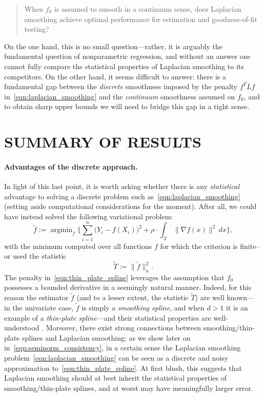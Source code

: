 \documentclass[twoside]{article}
\newcommand{\1}{\mathbf{1}}
\DeclareMathOperator*{\argmin}{argmin}
\newcommand{\Lap}{L}
\newcommand{\Xset}{\mathcal{X}}
\newcommand{\wt}[1]{\widetilde{#1}}
\theoremstyle{definition}
\theoremstyle{remark}
\begin{document}
\begin{quote}{When $f_0$ is assumed to smooth in a continuum sense, does Laplacian smoothing achieve optimal performance for estimation and goodness-of-fit testing?} 
\end{quote}
On the one hand, this is no small question---rather, it is arguably the fundamental question of nonparametric regression, and without an answer one cannot fully compare the statistical properties of Laplacian smoothing to its competitors. On the other hand, it seems difficult to answer: there is a fundamental gap between the \emph{discrete} smoothness imposed by the penalty $f^T \Lap f$ in~\eqref{eqn:laplacian_smoothing} and the \emph{continuum} smoothness assumed on $f_0$, and to obtain sharp upper bounds we will need to bridge this gap in a tight sense.

\section{SUMMARY OF RESULTS}

\paragraph{Advantages of the discrete approach.} In light of this last point, it is worth asking whether there is any \emph{statistical} advantage to solving a discrete problem such as~\eqref{eqn:laplacian_smoothing} (setting aside computational considerations for the moment). After all, we could have instead solved the following variational problem:
\begin{equation}
\label{eqn:thin_plate_spline}
\wt{f} := \argmin_{f} \biggl\{\sum_{i = 1}^{n} \bigl(Y_i - f(X_i)\bigr)^2 + \rho \cdot \int_{\Xset} \|\nabla f(x)\|^2 \,dx \biggr\},
\end{equation}
with the minimum computed over all functions $f$ for which the criterion is finite--or used the statistic
\begin{equation}
\label{eqn:thin_plate_spline_test}
\wt{T} := \|\wt{f}\|_n^2.
\end{equation}
The penalty in~\eqref{eqn:thin_plate_spline} leverages the assumption that $f_0$ possesses a bounded derivative in a seemingly natural manner. Indeed, for this reason the estimator $\wt{f}$ (and to a lesser extent, the statistic $\wt{T}$) are well known--- in the univariate case, $\wt{f}$ is simply a \emph{smoothing spline}, and when $d > 1$ it is an example of a \emph{thin-plate spline}---and their statistical properties are well-understood \citep{vandergeer2000, liu2019}. Moreover, there exist strong connections between smoothing/thin-plate splines and Laplacian smoothing: as we show later on in~\eqref{eqn:seminorm_consistency}, in a certain sense the Laplacian smoothing problem~\eqref{eqn:laplacian_smoothing} can be seen as a discrete and noisy approximation to~\eqref{eqn:thin_plate_spline}. At first blush, this suggests that Laplacian smoothing should at best inherit the statistical properties of smoothing/thin-plate splines, and at worst may have meaningfully larger error.
\end{document}
